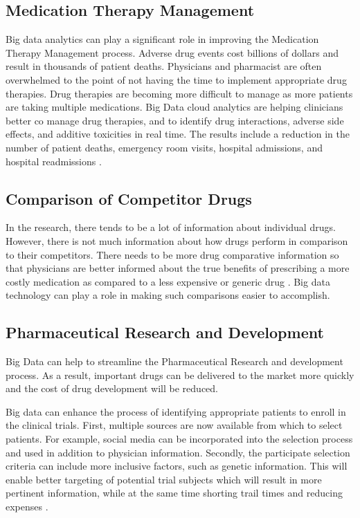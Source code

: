 \documentclass[sigconf]{acmart}
\begin{document}
\subsection{Medication Therapy Management}
Big data analytics can play a significant role in improving the Medication Therapy Management process.  Adverse drug events cost billions of dollars and result in thousands of patient deaths.  Physicians and pharmacist are often overwhelmed to the point of not having the time to implement appropriate drug therapies. Drug therapies are becoming more difficult to manage as more patients are taking multiple medications.  Big Data cloud analytics are helping clinicians better co manage drug therapies, and to identify drug interactions, adverse side effects, and additive toxicities in real time. The results include a reduction in the number of patient deaths, emergency room visits, hospital admissions, and hospital readmissions \cite{www-google-data}.

\subsection{Comparison of Competitor Drugs}
In the research, there tends to be a lot of information about individual drugs. However, there is not much information about how drugs perform in comparison to their competitors.  There needs to be more drug comparative information so that physicians are better informed about the true benefits of prescribing a more costly medication as compared to a less expensive or generic drug \cite{www-google-drug}. Big data technology can play a role in making such comparisons easier to accomplish. 

\subsection{Pharmaceutical Research and Development}

Big Data can help to streamline the Pharmaceutical Research and development process. As a result, important drugs can be delivered to the market more quickly and the cost of drug development will be reduced.

Big data can enhance the process of identifying appropriate patients to enroll in the clinical trials. First, multiple sources are now available from which to select patients. For example, social media can be incorporated into the selection process and used in addition to physician information. Secondly, the participate selection criteria can include more inclusive factors, such as genetic information. This will enable better targeting of potential trial subjects which will result in more pertinent information, while at the same time shorting trail times and reducing expenses \cite{www-google-pharmrd}.
\end{document}
